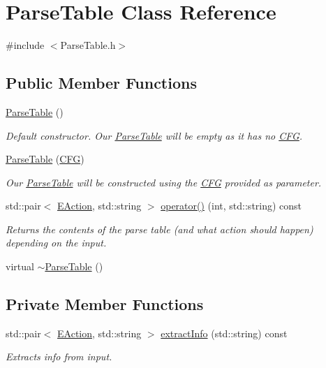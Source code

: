 \hypertarget{classParseTable}{\section{\-Parse\-Table \-Class \-Reference}
\label{d9/da1/classParseTable}
}


{\ttfamily \#include $<$\-Parse\-Table.\-h$>$}

\subsection*{\-Public \-Member \-Functions}
\begin{DoxyCompactItemize}
\item 
\hyperlink{classParseTable_acacf41ffea967138a7eb200a1d03c0bf}{\-Parse\-Table} ()
\begin{DoxyCompactList}\small\item\em \-Default constructor. \-Our \hyperlink{classParseTable}{\-Parse\-Table} will be empty as it has no \hyperlink{classCFG}{\-C\-F\-G}. \end{DoxyCompactList}\item 
\hyperlink{classParseTable_a71107a2b7d2b83142a31d08d9e960fee}{\-Parse\-Table} (\hyperlink{classCFG}{\-C\-F\-G})
\begin{DoxyCompactList}\small\item\em \-Our \hyperlink{classParseTable}{\-Parse\-Table} will be constructed using the \hyperlink{classCFG}{\-C\-F\-G} provided as parameter. \end{DoxyCompactList}\item 
std\-::pair$<$ \hyperlink{ParseTable_8h_a81d4868b129e5f45325894085a36a8a5}{\-E\-Action}, std\-::string $>$ \hyperlink{classParseTable_a276cf2fa3182cff81da31ce69c26a30c}{operator()} (int, std\-::string) const 
\begin{DoxyCompactList}\small\item\em \-Returns the contents of the parse table (and what action should happen) depending on the input. \end{DoxyCompactList}\item 
virtual \hyperlink{classParseTable_aa3c8f1c8313c216e39388ec0bd64afc6}{$\sim$\-Parse\-Table} ()
\end{DoxyCompactItemize}
\subsection*{\-Private \-Member \-Functions}
\begin{DoxyCompactItemize}
\item 
std\-::pair$<$ \hyperlink{ParseTable_8h_a81d4868b129e5f45325894085a36a8a5}{\-E\-Action}, std\-::string $>$ \hyperlink{classParseTable_a67d59fa53fbc3136cc8ad6e20c7edf87}{extract\-Info} (std\-::string) const 
\begin{DoxyCompactList}\small\item\em \-Extracts info from input. \end{DoxyCompactList}\end{DoxyCompactItemize}
